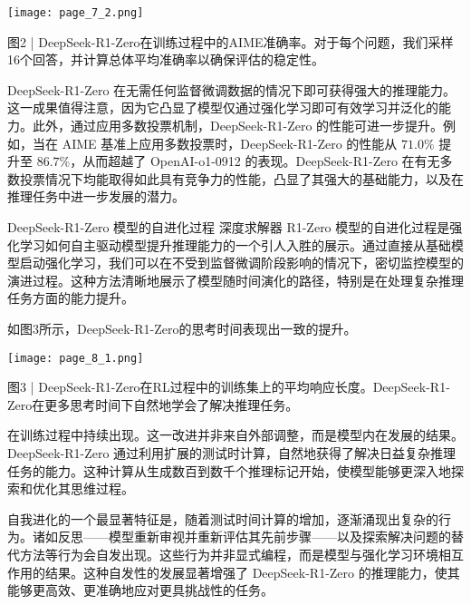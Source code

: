 \documentclass[12pt,a4paper]{report} %
\begin{document}
\begin{center}
\texttt{[image: page\_7\_2.png]}
\end{center}
\begin{center}


图2 | DeepSeek-R1-Zero在训练过程中的AIME准确率。对于每个问题，我们采样16个回答，并计算总体平均准确率以确保评估的稳定性。


\end{center}




DeepSeek-R1-Zero 在无需任何监督微调数据的情况下即可获得强大的推理能力。这一成果值得注意，因为它凸显了模型仅通过强化学习即可有效学习并泛化的能力。此外，通过应用多数投票机制，DeepSeek-R1-Zero 的性能可进一步提升。例如，当在 AIME 基准上应用多数投票时，DeepSeek-R1-Zero 的性能从 $71.0 \%$ 提升至 $86.7 \%$，从而超越了 OpenAI-o1-0912 的表现。DeepSeek-R1-Zero 在有无多数投票情况下均能取得如此具有竞争力的性能，凸显了其强大的基础能力，以及在推理任务中进一步发展的潜力。


DeepSeek-R1-Zero 模型的自进化过程 深度求解器 R1-Zero 模型的自进化过程是强化学习如何自主驱动模型提升推理能力的一个引人入胜的展示。通过直接从基础模型启动强化学习，我们可以在不受到监督微调阶段影响的情况下，密切监控模型的演进过程。这种方法清晰地展示了模型随时间演化的路径，特别是在处理复杂推理任务方面的能力提升。


如图3所示，DeepSeek-R1-Zero的思考时间表现出一致的提升。
\begin{center}
\texttt{[image: page\_8\_1.png]}
\end{center}
\begin{center}


图3 | DeepSeek-R1-Zero在RL过程中的训练集上的平均响应长度。DeepSeek-R1-Zero在更多思考时间下自然地学会了解决推理任务。


\end{center}




在训练过程中持续出现。这一改进并非来自外部调整，而是模型内在发展的结果。DeepSeek-R1-Zero 通过利用扩展的测试时计算，自然地获得了解决日益复杂推理任务的能力。这种计算从生成数百到数千个推理标记开始，使模型能够更深入地探索和优化其思维过程。


自我进化的一个最显著特征是，随着测试时间计算的增加，逐渐涌现出复杂的行为。诸如反思——模型重新审视并重新评估其先前步骤——以及探索解决问题的替代方法等行为会自发出现。这些行为并非显式编程，而是模型与强化学习环境相互作用的结果。这种自发性的发展显著增强了 DeepSeek-R1-Zero 的推理能力，使其能够更高效、更准确地应对更具挑战性的任务。
\end{document}
